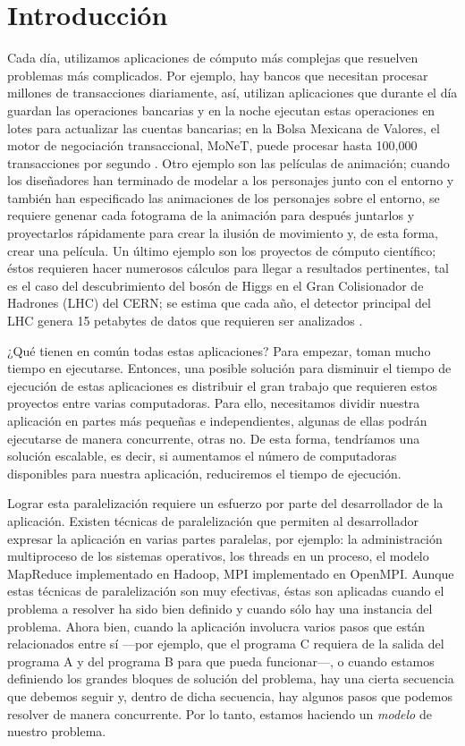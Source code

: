 \chapter{Introducción}
Cada día, utilizamos aplicaciones de cómputo más complejas que resuelven problemas más complicados. Por ejemplo, hay bancos que necesitan procesar millones de transacciones diariamente, así, utilizan aplicaciones que durante el día guardan las operaciones bancarias y en la noche ejecutan estas operaciones en lotes para actualizar las cuentas bancarias; en la Bolsa Mexicana de Valores, el motor de negociación transaccional, MoNeT, puede procesar hasta 100,000 transacciones por segundo \cite{bmv2012informe}. Otro ejemplo son las películas de animación; cuando los diseñadores han terminado de modelar a los personajes junto con el entorno y también han especificado las animaciones de los personajes sobre el entorno, se requiere genenar cada fotograma de la animación para después juntarlos y proyectarlos rápidamente para crear la ilusión de movimiento y, de esta forma, crear una película. Un último ejemplo son los proyectos de cómputo científico; éstos requieren hacer numerosos cálculos para llegar a resultados pertinentes, tal es el caso del descubrimiento del bosón de Higgs en el Gran Colisionador de Hadrones (LHC) del CERN; se estima que cada año, el detector principal del LHC genera 15 petabytes de datos que requieren ser analizados \cite{shiers2007worldwide}. 

¿Qué tienen en común todas estas aplicaciones? Para empezar, toman mucho tiempo en ejecutarse. Entonces, una posible solución para disminuir el tiempo de ejecución de estas aplicaciones es distribuir el gran trabajo que requieren estos proyectos entre varias computadoras. Para ello, necesitamos dividir nuestra aplicación en partes más pequeñas e independientes, algunas de ellas podrán ejecutarse de manera concurrente, otras no. De esta forma, tendríamos una solución escalable, es decir, si aumentamos el número de computadoras disponibles para nuestra aplicación, reduciremos el tiempo de ejecución.

Lograr esta paralelización requiere un esfuerzo por parte del desarrollador de la aplicación. Existen técnicas de paralelización que permiten al desarrollador expresar la aplicación en varias partes paralelas, por ejemplo: la administración multiproceso de los sistemas operativos, los threads en un proceso, el modelo MapReduce implementado en Hadoop, MPI implementado en OpenMPI. Aunque estas técnicas de paralelización son muy efectivas, éstas son aplicadas cuando el problema a resolver ha sido bien definido y cuando sólo hay una instancia del problema. Ahora bien, cuando la aplicación involucra varios pasos que están relacionados entre sí —por ejemplo, que el programa C requiera de la salida del programa A y del programa B para que pueda funcionar—, o cuando estamos definiendo los grandes bloques de solución del problema, hay una cierta secuencia que debemos seguir y, dentro de dicha secuencia, hay algunos pasos que podemos resolver de manera concurrente. Por lo tanto, estamos haciendo un \emph{modelo} de nuestro problema.

